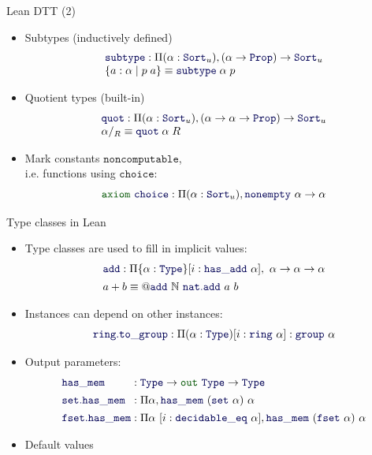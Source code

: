\documentclass{beamer}
\newcommand{\kw}[1]{{\color{green!33!black}\ensuremath{\mathtt{#1}}}}
\newcommand{\ident}[1]{{\color{blue!33!black}\ensuremath{\mathtt{#1}}}}
\begin{document}
\begin{frame}{Lean DTT (2)}
  \begin{itemize}[<+->]
    \item Subtypes (inductively defined)
      \[ \begin{array}{l}
        \ident{subtype} : \Pi (\alpha : \ident{Sort}_u),
          (\alpha \to \ident{Prop}) \to \ident{Sort}_u \\
        \{ a : \alpha \mid p\;a \} \equiv \ident{subtype}\;\alpha\;p
      \end{array} \]
    \item Quotient types (built-in)
      \[ \begin{array}{l} 
        \ident{quot} : \Pi (\alpha : \ident{Sort}_u),
          (\alpha \to \alpha \to \ident{Prop}) \to \ident{Sort}_u \\
        \alpha /_R \equiv \ident{quot}\;\alpha\;R
      \end{array} \]
    \item Mark constants \kw{noncomputable}, \\
      i.e. functions using \ident{choice}:
 \[ \kw{axiom}~\ident{choice} : \Pi (\alpha : \ident{Sort}_u), \ident{nonempty}~\alpha \to \alpha \]
  \end{itemize}
\end{frame}

\begin{frame}{Type classes in Lean}
  \begin{itemize}[<+->]
    \item Type classes are used to fill in implicit values:
    \[ \begin{array}{l}
      \ident{add} : \Pi \{\alpha : \ident{Type}\} [i : \ident{has\_add}~\alpha],~\alpha\to\alpha\to\alpha \\[1ex]
      a + b \equiv @\ident{add}~\mathbb{N}~\ident{nat.add}~a~b
    \end{array} \]
    \item Instances can depend on other instances:
      \[ \ident{ring.to\_group} : \Pi (\alpha : \ident{Type}) [i : \ident{ring}~\alpha] : \ident{group}~\alpha \]
    \item Output parameters:
    \[ \begin{array}{l@{\;:\;}l}
      \ident{has\_mem} & \ident{Type} \to \kw{out}~\ident{Type} \to \ident{Type} \\[1ex]
      \ident{set.has\_mem} & \Pi \alpha, \ident{has\_mem}~(\ident{set}~\alpha)~\alpha \\[1ex]
      \ident{fset.has\_mem} & \Pi \alpha~[i : \ident{decidable\_eq}~\alpha], \ident{has\_mem}~(\ident{fset}~\alpha)~\alpha
    \end{array} \]
    \item Default values
  \end{itemize}
\end{frame}
\end{document}
